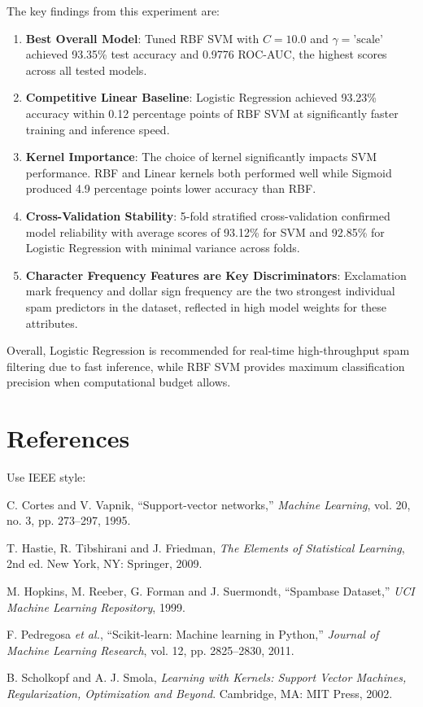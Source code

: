 \documentclass[12pt,a4paper]{article}
\begin{document}
The key findings from this experiment are:

\begin{enumerate}
\item \textbf{Best Overall Model}: Tuned RBF SVM with $C=10.0$ and $\gamma=\text{'scale'}$ achieved 93.35\% test accuracy and 0.9776 ROC-AUC, the highest scores across all tested models.
\item \textbf{Competitive Linear Baseline}: Logistic Regression achieved 93.23\% accuracy within 0.12 percentage points of RBF SVM at significantly faster training and inference speed.
\item \textbf{Kernel Importance}: The choice of kernel significantly impacts SVM performance. RBF and Linear kernels both performed well while Sigmoid produced 4.9 percentage points lower accuracy than RBF.
\item \textbf{Cross-Validation Stability}: 5-fold stratified cross-validation confirmed model reliability with average scores of 93.12\% for SVM and 92.85\% for Logistic Regression with minimal variance across folds.
\item \textbf{Character Frequency Features are Key Discriminators}: Exclamation mark frequency and dollar sign frequency are the two strongest individual spam predictors in the dataset, reflected in high model weights for these attributes.
\end{enumerate}

Overall, Logistic Regression is recommended for real-time high-throughput spam filtering due to fast inference, while RBF SVM provides maximum classification precision when computational budget allows.

\section{References}
Use IEEE style:
\begin{enumerate}[label={[\arabic*]}]
\item C. Cortes and V. Vapnik, ``Support-vector networks,'' \textit{Machine Learning}, vol. 20, no. 3, pp. 273--297, 1995.
\item T. Hastie, R. Tibshirani and J. Friedman, \textit{The Elements of Statistical Learning}, 2nd ed. New York, NY: Springer, 2009.
\item M. Hopkins, M. Reeber, G. Forman and J. Suermondt, ``Spambase Dataset,'' \textit{UCI Machine Learning Repository}, 1999.
\item F. Pedregosa \textit{et al.}, ``Scikit-learn: Machine learning in Python,'' \textit{Journal of Machine Learning Research}, vol. 12, pp. 2825--2830, 2011.
\item B. Scholkopf and A. J. Smola, \textit{Learning with Kernels: Support Vector Machines, Regularization, Optimization and Beyond}. Cambridge, MA: MIT Press, 2002.
\end{enumerate}
\end{document}
